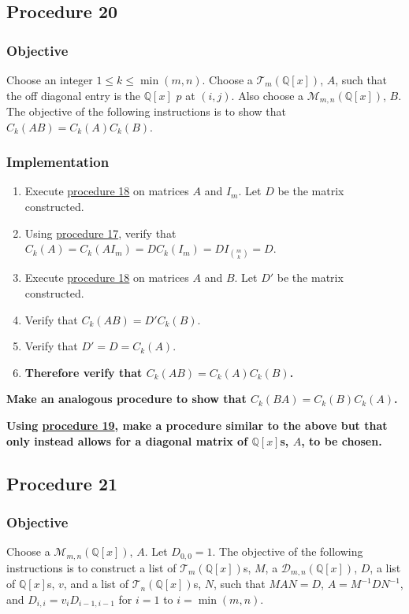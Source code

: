 \documentclass[twocolumn]{article}
\begin{document}
		\subsection{Procedure 20}\label{sec:procedure 20}
			\subsubsection{Objective}
				Choose an integer $1\le k\le\min(m,n)$. Choose a $\mathcal{T}_{m}(\mathbb{Q}[x])$, $A$, such that the off diagonal entry is the $\mathbb{Q}[x]$ $p$ at $(i,j)$. Also choose a $\mathcal{M}_{m,n}(\mathbb{Q}[x])$, $B$. The objective of the following instructions is to show that $C_k(AB)=C_k(A)C_k(B)$.
			\subsubsection{Implementation}
				\begin{enumerate}
					\item Execute \hyperref[sec:procedure 18]{procedure 18} on matrices $A$ and $I_m$. Let $D$ be the matrix constructed.
					\item Using \hyperref[sec:procedure 17]{procedure 17}, verify that $C_k(A)=C_k(AI_m)=DC_k(I_m)=DI_{\binom{m}{k}}=D$.
					\item Execute \hyperref[sec:procedure 18]{procedure 18} on matrices $A$ and $B$. Let $D'$ be the matrix constructed.
					\item Verify that $C_k(AB)=D'C_k(B)$.
					\item Verify that $D'=D=C_k(A)$.
					\item \textbf{Therefore verify that $C_k(AB)=C_k(A)C_k(B)$.}
				\end{enumerate}
			\textbf{Make an analogous procedure to show that $C_k(BA)=C_k(B)C_k(A)$.}
			
			\textbf{Using \hyperref[sec:procedure 19]{procedure 19}, make a procedure similar to the above but that only instead allows for a diagonal matrix of $\mathbb{Q}[x]$s, $A$, to be chosen.}
		\subsection{Procedure 21}\label{sec:procedure 21}
			\subsubsection{Objective}
				Choose a $\mathcal{M}_{m,n}(\mathbb{Q}[x])$, $A$. Let $D_{0,0}=1$. The objective of the following instructions is to construct a list of $\mathcal{T}_{m}(\mathbb{Q}[x])$s, $M$, a $\mathcal{D}_{m,n}(\mathbb{Q}[x])$, $D$, a list of $\mathbb{Q}[x]$s, $v$, and a list of $\mathcal{T}_{n}(\mathbb{Q}[x])$s, $N$, such that $MAN=D$, $A=M^{-1}DN^{-1}$, and $D_{i,i}=v_iD_{i-1,i-1}$ for $i=1$ to $i=\min(m,n)$.
\end{document}
